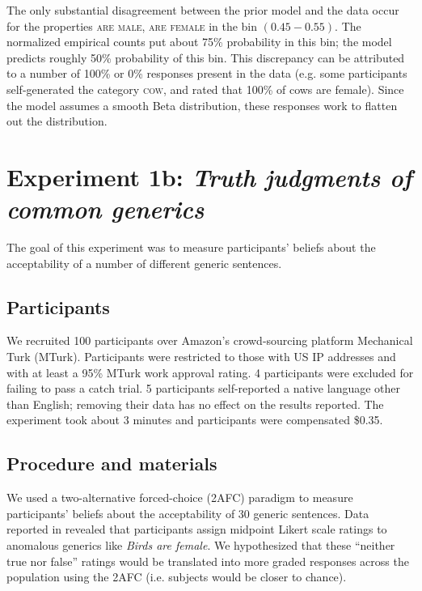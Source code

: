 \documentclass[10pt,letterpaper]{article}
\begin{document}
The only substantial disagreement between the prior model and the data occur for  the properties \textsc{are male, are female} in the bin $(0.45-0.55)$. 
The normalized empirical counts put about 75\% probability in this bin; the model predicts roughly 50\% probability of this bin. 
This discrepancy can be attributed to a number of 100\% or 0\% responses present in the data (e.g. some participants self-generated the category \textsc{cow}, and rated that 100\% of cows are female). 
Since the model assumes a smooth Beta distribution, these responses work to flatten out the distribution.


\section{Experiment 1b: \emph{Truth judgments of common generics}}
\label{truthjudements:naturalcases}

The goal of this experiment was to measure participants' beliefs about the acceptability of a number of different generic sentences. 

\subsection{Participants}

We recruited 100 participants over Amazon's crowd-sourcing platform Mechanical Turk (MTurk).  
Participants were restricted to those with US IP addresses and with at least a 95\% MTurk work approval rating. 
4 participants were excluded for failing to pass a catch trial.
5 participants self-reported a native language other than English; removing their data has no effect on the results reported. 
The experiment took about 3 minutes and participants were compensated \$0.35.

\subsection{Procedure and materials}
\label{sec:prior2materials}

We used a two-alternative forced-choice (2AFC) paradigm to measure participants' beliefs about the acceptability of 30 generic sentences. 
Data reported in  revealed that participants assign midpoint Likert scale ratings to anomalous generics like \emph{Birds are female}. 
We hypothesized that these ``neither true nor false'' ratings would be translated into more graded responses across the population using the 2AFC (i.e. subjects would be closer to chance).
\end{document}
